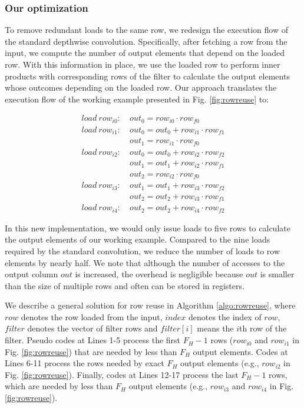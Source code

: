 \subsubsection{Our optimization}
To remove redundant loads to the same row, we redesign the execution flow of the standard depthwise convolution. Specifically, after
fetching a row from the input, we compute the number of output elements that depend on the loaded row. 
With this information in place, we use the loaded row to perform inner products with corresponding rows of the filter to
calculate the output elements whose outcomes depending on the loaded row. Our approach translates the execution flow of the working example
presented in Fig. \ref {fig:rowreuse} to:

\begin{equation}\nonumber
\begin{aligned}
load\ row_{i0}:
&\ out_0=row_{i0} \cdot row_{f0} \\
load\ row_{i1}:
&\ out_0 = out_0+row_{i1} \cdot row_{f1}\\
&\ out_1=row_{i1} \cdot row_{f0}\\
load\ row_{i2}:
&\ out_0 = out_0+row_{i2} \cdot row_{f2}\\
&\ out_1 = out_1+row_{i2} \cdot row_{f1}\\
&\ out_{2}=row_{i2} \cdot row_{f0}\\
load\ row_{i3}:
&\ out_1=out_1+row_{i3} \cdot row_{f2} \\
&\ out_2=out_2+row_{i3} \cdot row_{f1}\\
load\ row_{i4}:
&\ out_2=out_2+row_{i4} \cdot row_{f2}
\end{aligned}	
\end{equation}

In this new implementation, we would only issue loads to five rows to calculate the output elements of our working example. Compared to the
nine loads required by the standard convolution, we reduce the number of loads to row elements by nearly half. We note that although the
number of accesses to the output column $out$ is increased, the overhead is negligible because $out$ is smaller than the size of multiple
rows and often can be stored in registers.

We describe a general solution for row reuse in Algorithm \ref{algo:rowreuse}, where $row$ denotes the row loaded from the input, $index$ denotes the index of $row$, $filter$ denotes the vector of filter rows and $filter[i]$ means the $i$th row of the filter.
Pseudo codes at Lines 1-5 process the first $F_H-1$ rows ($row_{i0}$ and $row_{i1}$ in Fig. \ref{fig:rowreuse}) that are needed by less than $F_H$ output elements.
Codes at Lines 6-11 process the rows needed by exact $F_H$ output elements (e.g., $row_{i2}$ in Fig. \ref{fig:rowreuse}).
Finally, codes at Lines 12-17 process the last $F_H-1$ rows, which are needed by less than $F_H$ output elements (e.g., $row_{i3}$ and $row_{i4}$ in Fig. \ref{fig:rowreuse}).

